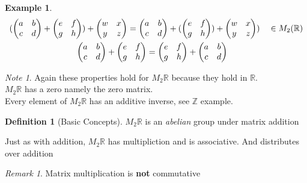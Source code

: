 \documentclass{article}
\theoremstyle{plain}
\theoremstyle{definition}
\newtheorem{defn}{Definition}[section]
\newtheorem{exmp}{Example}[section]
\theoremstyle{remark}
\newtheorem*{rem}{Remark}
\newtheorem*{note}{Note}
\begin{document}
\begin{exmp}
\begin{align}
		(\begin{pmatrix} a & b \\ c & d \end{pmatrix}	+ 	\begin{pmatrix} e & f \\ g & h \end{pmatrix}) + \begin{pmatrix} w & x \\ y & z \end{pmatrix} = \begin{pmatrix} a & b \\ c & d \end{pmatrix} + (\begin{pmatrix} e & f \\ g & h \end{pmatrix}) + \begin{pmatrix} w & x \\ y & z \end{pmatrix}) \hspace{10px} \in M_2(\mathbb{R}) \\
 \begin{pmatrix} a & b \\ c & d \end{pmatrix}	 + 	\begin{pmatrix} e & f \\ g & h \end{pmatrix} = \begin{pmatrix} e & f \\ g & h \end{pmatrix}	+ 	\begin{pmatrix} a & b \\ c & d \end{pmatrix}		\hspace{90px}
\end{align}
\end{exmp}

\begin{note}
Again these properties hold for $M_2\mathbb{R}$ because they hold in $\mathbb{R}$.
\\
$M_2\mathbb{R}$ has a zero namely the zero matrix.
\\
Every element of $M_2\mathbb{R}$ has an additive inverse, see $\mathbb{Z}$ example.\\
\end{note}

\begin{defn}[Basic Concepts]
	$M_2\mathbb{R}$ is an \textit{abelian} group under matrix addition
\end{defn}
Just as with addition, $M_2\mathbb{R}$ has multipliction and is associative. And distributes over addition
\begin{rem}
	Matrix multiplication is \textbf{not} commutative
\end{rem}
\pagebreak
\end{document}
